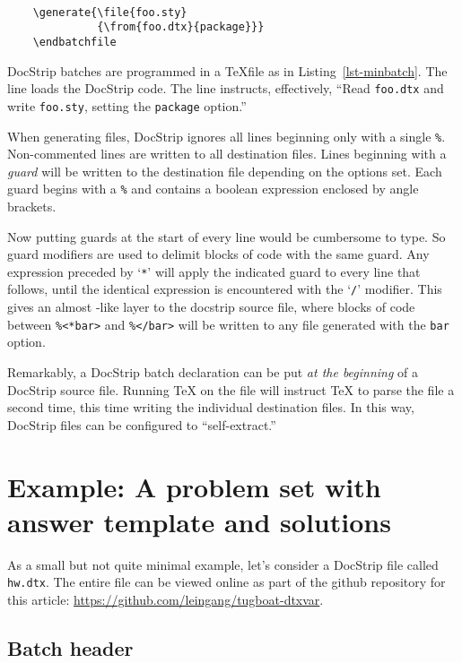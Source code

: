 \documentclass{ltugboat}
\newcommand{\fn}[1]{\texttt{#1}}  %
\newcommand{\opt}[1]{\texttt{#1}} %
\newcommand{\docstrip}{\texorpdfstring{\textsf{DocStrip}}{DocStrip}}
\begin{document}
\begin{lstlisting}[float,
    numbers=none,
    caption={A minimal \docstrip{} batch file},
    label={lst-minbatch}
]
     
    \generate{\file{foo.sty}
              {\from{foo.dtx}{package}}}
    \endbatchfile
\end{lstlisting}

\docstrip{} batches are programmed in a \TeX file as in
Listing~\ref{lst-minbatch}.  The  line loads the \docstrip{} code.
The  line instructs, effectively, ``Read \fn{foo.dtx} and write
\fn{foo.sty}, setting the \opt{package} option.''

When generating files, \docstrip{} ignores all lines beginning only with a
single \verb!%!.  Non-commented lines are written to all destination files.
Lines beginning with a \emph{guard} will be written to the destination file
depending on the options set.  Each guard begins with a \verb!%! and contains a
boolean expression enclosed by angle brackets.

Now putting guards at the start of every line would be cumbersome to type.  So
guard modifiers are used to delimit blocks of code with the same guard.  Any
expression preceded by `\verb|*|' will apply the indicated guard to every line that
follows, until the identical expression is encountered with the `\verb|/|' modifier.
This gives an almost -like layer to the docstrip source file, where blocks
of code between \verb!%<*bar>! and \verb!%</bar>! will be written to any file
generated with the \opt{bar} option.

Remarkably, a \docstrip{} batch declaration can be put \emph{at the beginning}
of a \docstrip{} source file.  Running \TeX{} on the file will instruct \TeX{}
to parse the file a second time, this time writing the individual destination
files.  In this way, \docstrip{} files can be configured to ``self-extract.''

\section{Example: A problem set with answer template and solutions}
\label{sec-exam}

As a small but not quite minimal example, let's consider a \docstrip{} file
called \fn{hw.dtx}.  The entire file can be viewed online as part of the github
repository for this article: \url{https://github.com/leingang/tugboat-dtxvar}.

\subsection{Batch header}
\end{document}
